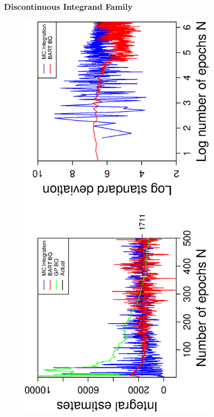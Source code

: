 \subsubsection*{Discontinuous Integrand Family}
\vspace{-1.5cm}
\begin{figure}[H]
  \centering
  \hspace{-1.2cm}
  \begin{minipage}[b]{0.4\textwidth}
    \includegraphics[width = 0.9\textwidth, angle = -90]{report/Figures/3/convergenceMean32Dimensions.eps}

\end{minipage}
\end{figure}
